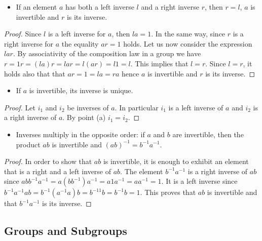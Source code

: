 \documentclass[
]{book}
\providecommand{\tightlist}{%
  \setlength{\itemsep}{0pt}\setlength{\parskip}{0pt}}
\theoremstyle{definition}
\theoremstyle{definition}
\theoremstyle{definition}
\theoremstyle{definition}
\theoremstyle{remark}
\begin{document}
\begin{itemize}
\tightlist
\item
  If an element \(a\) has both a left inverse \(l\) and a right inverse \(r\), then \(r = l\), \(a\) is invertible and \(r\) is its inverse.
\end{itemize}

\begin{proof}
Since \(l\) is a left inverse for \(a\), then \(la = 1\). In the same way, since \(r\) is a right inverse for \(a\) the equality \(ar = 1\) holds. Let us now consider the expression \(lar\). By associativity of the composition law in a group we have \(r = 1r = (la)r = lar = l(ar) = l1 = l\). This implies that \(l = r\). Since \(l = r\), it holds also that that \(ar = 1 = la = ra\) hence \(a\) is invertible and \(r\) is its inverse.
\end{proof}

\begin{itemize}
\tightlist
\item
  If \(a\) is invertible, its inverse is unique.
\end{itemize}

\begin{proof}
Let \(i_1\) and \(i_2\) be inverses of \(a\). In particular \(i_1\) is a left inverse of \(a\) and \(i_2\) is a right inverse of \(a\). By point (a) \(i_1 = i_2\).
\end{proof}

\begin{itemize}
\tightlist
\item
  Inverses multiply in the opposite order: if \(a\) and \(b\) are invertible, then the product \(ab\) is invertible and \((ab)^{-1} = b^{-1}a^{-1}\).
\end{itemize}

\begin{proof}
In order to show that \(ab\) is invertible, it is enough to exhibit an element that is a right and a left inverse of \(ab\). The element \(b^{-1}a^{-1}\) is a right inverse of \(ab\) since \(abb^{-1}a^{-1} = a(bb^{-1})a^{-1} = a1a^{-1} = aa^{-1} = 1\). It is a left inverse since \(b^{-1}a^{-1}ab = b^{-1}(a^{-1}a)b = b^{-11}b = b^{-1}b = 1\). This proves that \(ab\) is invertible and that \(b^{-1}a^{-1}\) is its inverse.
\end{proof}

\hypertarget{groups-and-subgroups-1}{%
\subsection{Groups and Subgroups}\label{groups-and-subgroups-1}}
\end{document}

